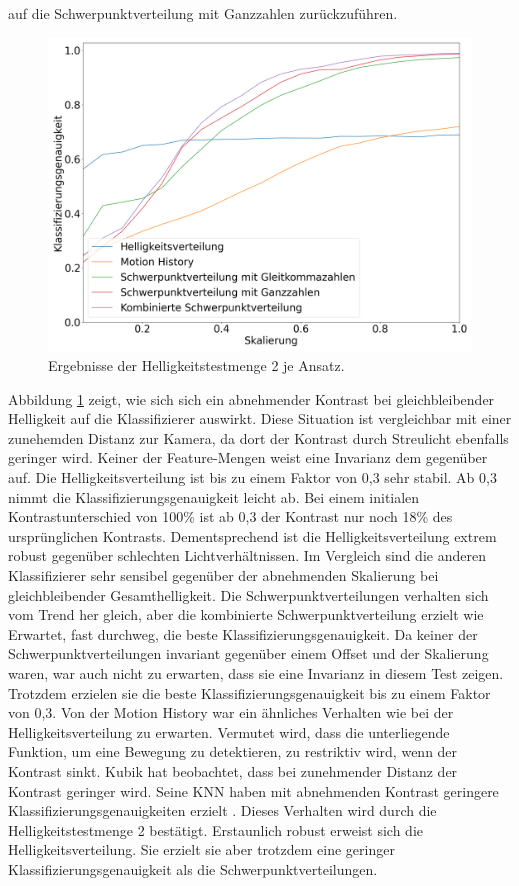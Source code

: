 auf die Schwerpunktverteilung mit Ganzzahlen zurückzuführen.
\begin{figure}[h!]
    \centering
    \includegraphics[width=\linewidth]{images/brightness2_scaling.png}
    \caption{Ergebnisse der Helligkeitstestmenge 2 je Ansatz.}
    \label{fig:brightness2_scaling}
\end{figure}
\newline
\newline
Abbildung \ref{fig:brightness2_scaling} zeigt, wie sich sich ein abnehmender Kontrast bei gleichbleibender Helligkeit auf die Klassifizierer auswirkt. Diese Situation ist vergleichbar mit einer zunehemden Distanz
zur Kamera, da dort der Kontrast durch Streulicht ebenfalls geringer wird. Keiner der Feature-Mengen weist eine Invarianz dem gegenüber auf. Die Helligkeitsverteilung ist bis zu einem Faktor von 0,3 sehr stabil. Ab 0,3
nimmt die Klassifizierungsgenauigkeit leicht ab. Bei einem initialen Kontrastunterschied von 100\% ist ab 0,3 der Kontrast nur noch 18\% des ursprünglichen Kontrasts. Dementsprechend ist die Helligkeitsverteilung extrem
robust gegenüber schlechten Lichtverhältnissen. Im Vergleich sind die anderen Klassifizierer sehr sensibel gegenüber der abnehmenden Skalierung bei gleichbleibender Gesamthelligkeit.
Die Schwerpunktverteilungen verhalten sich vom Trend her gleich, aber die
kombinierte Schwerpunktverteilung erzielt wie Erwartet, fast durchweg, die beste Klassifizierungsgenauigkeit. Da keiner der Schwerpunktverteilungen invariant gegenüber einem Offset und der Skalierung waren, war auch
nicht zu erwarten, dass sie eine Invarianz in diesem Test zeigen. Trotzdem erzielen sie die beste Klassifizierungsgenauigkeit bis zu einem Faktor von 0,3. Von der Motion History war ein ähnliches Verhalten wie bei der
Helligkeitsverteilung zu erwarten. Vermutet wird, dass die unterliegende Funktion, um eine Bewegung zu detektieren, zu restriktiv wird, wenn der Kontrast sinkt.
\newline
\newline
Kubik hat beobachtet, dass bei zunehmender Distanz der Kontrast geringer wird. Seine KNN haben mit abnehmenden Kontrast geringere Klassifizierungsgenauigkeiten erzielt \cite{kubikThesis}. Dieses Verhalten wird durch die
Helligkeitstestmenge 2 bestätigt. Erstaunlich robust erweist sich die Helligkeitsverteilung. Sie erzielt sie aber trotzdem eine geringer Klassifizierungsgenauigkeit als die Schwerpunktverteilungen.